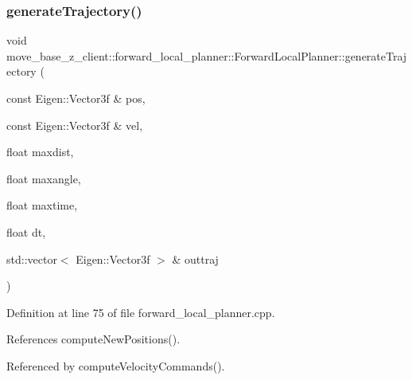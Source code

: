 \subsubsection{\texorpdfstring{generate\+Trajectory()}{generateTrajectory()}}
{\footnotesize\ttfamily void move\+\_\+base\+\_\+z\+\_\+client\+::forward\+\_\+local\+\_\+planner\+::\+Forward\+Local\+Planner\+::generate\+Trajectory (\begin{DoxyParamCaption}\item[{const Eigen\+::\+Vector3f \&}]{pos,  }\item[{const Eigen\+::\+Vector3f \&}]{vel,  }\item[{float}]{maxdist,  }\item[{float}]{maxangle,  }\item[{float}]{maxtime,  }\item[{float}]{dt,  }\item[{std\+::vector$<$ Eigen\+::\+Vector3f $>$ \&}]{outtraj }\end{DoxyParamCaption})\hspace{0.3cm}{\ttfamily [private]}}



Definition at line 75 of file forward\+\_\+local\+\_\+planner.\+cpp.



References compute\+New\+Positions().



Referenced by compute\+Velocity\+Commands().


